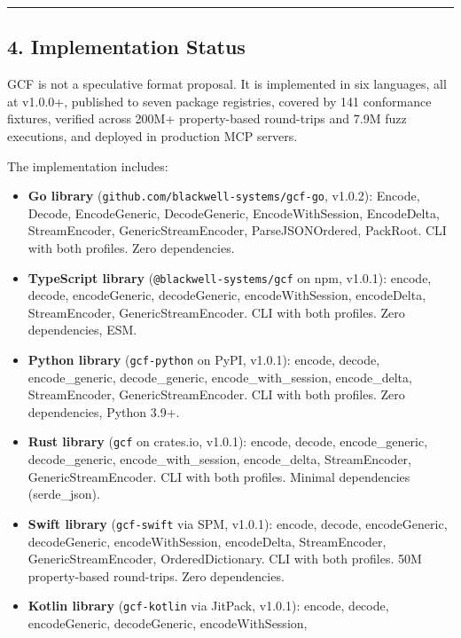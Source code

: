 \documentclass[
  11pt,
  paper=a4,
  ,captions=tableheading
]{scrartcl}
\providecommand{\tightlist}{%
  \setlength{\itemsep}{0pt}\setlength{\parskip}{0pt}}
\begin{document}
\begin{center}\rule{0.5\linewidth}{0.5pt}\end{center}

\subsection{4. Implementation Status}\label{implementation-status}

GCF is not a speculative format proposal. It is implemented in six
languages, all at v1.0.0+, published to seven package registries,
covered by 141 conformance fixtures, verified across 200M+
property-based round-trips and 7.9M fuzz executions, and deployed in
production MCP servers.

The implementation includes:

\begin{itemize}
\tightlist
\item
  \textbf{Go library} (\texttt{github.com/blackwell-systems/gcf-go},
  v1.0.2): Encode, Decode, EncodeGeneric, DecodeGeneric,
  EncodeWithSession, EncodeDelta, StreamEncoder, GenericStreamEncoder,
  ParseJSONOrdered, PackRoot. CLI with both profiles. Zero dependencies.
\item
  \textbf{TypeScript library} (\texttt{@blackwell-systems/gcf} on npm,
  v1.0.1): encode, decode, encodeGeneric, decodeGeneric,
  encodeWithSession, encodeDelta, StreamEncoder, GenericStreamEncoder.
  CLI with both profiles. Zero dependencies, ESM.
\item
  \textbf{Python library} (\texttt{gcf-python} on PyPI, v1.0.1): encode,
  decode, encode\_generic, decode\_generic, encode\_with\_session,
  encode\_delta, StreamEncoder, GenericStreamEncoder. CLI with both
  profiles. Zero dependencies, Python 3.9+.
\item
  \textbf{Rust library} (\texttt{gcf} on crates.io, v1.0.1): encode,
  decode, encode\_generic, decode\_generic, encode\_with\_session,
  encode\_delta, StreamEncoder, GenericStreamEncoder. CLI with both
  profiles. Minimal dependencies (serde\_json).
\item
  \textbf{Swift library} (\texttt{gcf-swift} via SPM, v1.0.1): encode,
  decode, encodeGeneric, decodeGeneric, encodeWithSession, encodeDelta,
  StreamEncoder, GenericStreamEncoder, OrderedDictionary. CLI with both
  profiles. 50M property-based round-trips. Zero dependencies.
\item
  \textbf{Kotlin library} (\texttt{gcf-kotlin} via JitPack, v1.0.1):
  encode, decode, encodeGeneric, decodeGeneric, encodeWithSession,

\end{itemize}
\end{document}
